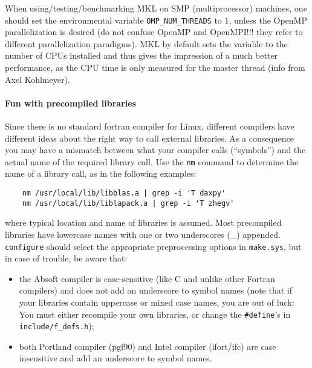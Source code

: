 \documentclass[12pt,a4paper]{article}
\begin{document}
When using/testing/benchmarking MKL on SMP (multiprocessor)
machines, one should set the environmental variable 
\texttt{OMP\_NUM\_THREADS} to 1, unless the OpenMP 
parallelization is desired (do not confuse OpenMP and OpenMPI!!!
they refer to different parallelization paradigms). 
MKL by default sets the variable to the number of CPUs installed and 
thus gives the impression of a much better performance, as the CPU time
is only measured for the master thread (info from Axel Kohlmeyer).

\paragraph{Fun with precompiled libraries}

Since there is no standard fortran compiler for Linux, different compilers
have different ideas about the right way to call external libraries.
As a consequence you may have a mismatch between what your compiler
calls (``symbols'') and the actual name of the required library call.
Use the \texttt{nm} command to determine the name of a library call,
as in the following examples:%
\begin{verbatim}
    nm /usr/local/lib/libblas.a | grep -i 'T daxpy'
    nm /usr/local/lib/liblapack.a | grep -i 'T zhegv'
\end{verbatim}
where typical location and name of libraries is assumed.
Most precompiled libraries have lowercase names with one or two
underscores (\_) appended. \texttt{configure} should select the 
appropriate preprocessing options in \texttt{make.sys}, but in
case of trouble, be aware that:
\begin{itemize}
  \item the Absoft compiler is case-sensitive (like C and unlike
        other Fortran compilers) and does not add an underscore
        to symbol names (note that if your libraries contain 
        uppercase or mixed case names, you are out of luck:
        You must either recompile your own libraries, or change 
        the \texttt{\#define}'s in \texttt{include/f\_defs.h});
  \item both Portland compiler (pgf90) and Intel compiler (ifort/ifc)
        are case insensitive and add an underscore to symbol names.
\end{itemize}
\end{document}
